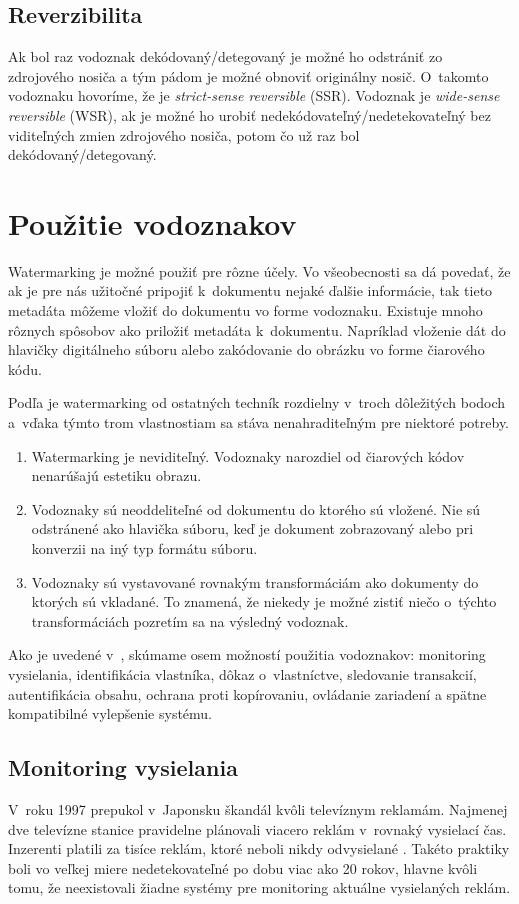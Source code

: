 \subsection{Reverzibilita}
Ak bol raz vodoznak dekódovaný/detegovaný je možné ho odstrániť zo zdrojového nosiča a tým pádom je možné obnoviť originálny nosič. O~takomto vodoznaku hovoríme, že je {\it strict-sense reversible} (SSR). Vodoznak je {\it wide-sense reversible} (WSR), ak je možné ho urobiť nedekódovateľný/nedetekovateľný bez viditeľných zmien zdrojového nosiča, potom čo už raz bol dekódovaný/detegovaný. \cite{Barni}

\section{Použitie vodoznakov}
Watermarking je možné použiť pre rôzne účely. Vo všeobecnosti sa dá povedať, že ak je pre nás užitočné pripojiť k~dokumentu nejaké ďalšie informácie, tak tieto metadáta môžeme vložiť do dokumentu vo forme vodoznaku. Existuje mnoho rôznych spôsobov ako priložiť metadáta k~dokumentu. Napríklad vloženie dát do hlavičky digitálneho súboru alebo zakódovanie do obrázku vo forme čiarového kódu.

Podľa \cite{Cox} je watermarking od ostatných techník rozdielny v~troch dôležitých bodoch a~vďaka týmto trom vlastnostiam sa stáva nenahraditeľným pre niektoré potreby.
\begin{enumerate}
    \item Watermarking je neviditeľný. Vodoznaky narozdiel od čiarových kódov nenarúšajú estetiku obrazu.
    \item Vodoznaky sú neoddeliteľné od dokumentu do ktorého sú vložené. Nie sú odstránené ako hlavička súboru, keď je dokument zobrazovaný alebo pri konverzii na iný typ formátu súboru.
    \item Vodoznaky sú vystavované rovnakým transformáciám ako dokumenty do ktorých sú vkladané. To znamená, že niekedy je možné zistiť niečo o~týchto transformáciách pozretím sa na výsledný vodoznak.
\end{enumerate}

Ako je uvedené v~\cite{Cox}, skúmame osem možností použitia vodoznakov: monitoring vysielania, identifikácia vlastníka, dôkaz o~vlastníctve, sledovanie transakcií, autentifikácia obsahu, ochrana proti kopírovaniu, ovládanie zariadení a spätne kompatibilné vylepšenie systému.

\subsection{Monitoring vysielania}
V~roku 1997 prepukol v~Japonsku škandál kvôli televíznym reklamám. Najmenej dve televízne stanice pravidelne plánovali viacero reklám v~rovnaký vysielací čas. Inzerenti platili za tisíce reklám, ktoré neboli nikdy odvysielané \cite{Cox}. Takéto praktiky boli vo veľkej miere nedetekovateľné po dobu viac ako 20 rokov, hlavne kvôli tomu, že neexistovali žiadne systémy pre monitoring aktuálne vysielaných reklám.

